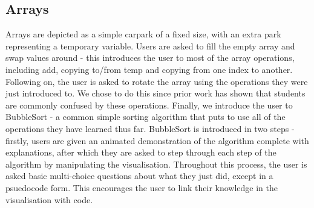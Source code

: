 \documentclass[10pt]{article}
\begin{document}
\subsection{Arrays}
Arrays are depicted as a simple carpark of a fixed size, with an extra park representing a temporary variable. Users are asked to fill the empty array and swap values around - this introduces the user to most of the array operations, including add, copying to/from temp and copying from one index to another. Following on, the user is asked to rotate the array using the operations they were just introduced to. We chose to do this since prior work\cite{izuloop} has shown that students are commonly confused by these operations. Finally, we introduce the user to BubbleSort - a common simple sorting algorithm that puts to use all of the operations they have learned thus far. BubbleSort is introduced in two steps - firstly, users are given an animated demonstration of the algorithm complete with explanations, after which they are asked to step through each step of the algorithm by manipulating the visualisation. Throughout this process, the user is asked basic multi-choice questions about what they just did, except in a psuedocode form. This encourages the user to link their knowledge in the visualisation with code.
\end{document}
